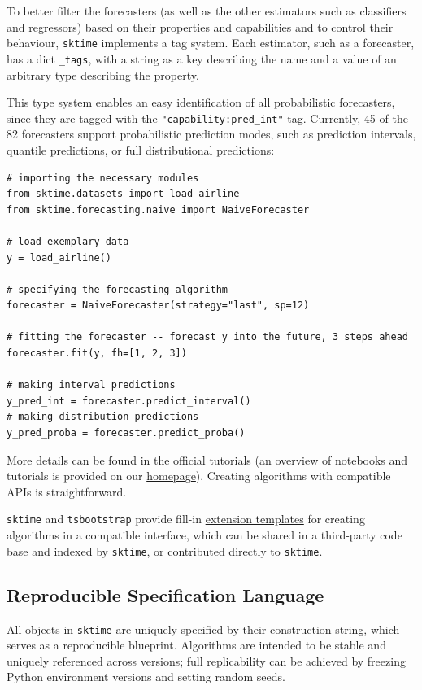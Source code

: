 To better filter the forecasters (as well as the other estimators such as classifiers and regressors) based on their properties and capabilities and to control their behaviour, \texttt{sktime} implements a tag system. Each estimator, such as a forecaster, has a dict \texttt{\_tags}, with a string as a key describing the name and a value of an arbitrary type describing the property.

This type system enables an easy identification of all probabilistic forecasters, since they are tagged with the \texttt{"capability:pred\_int"} tag. Currently, 45 of the 82 forecasters support probabilistic prediction modes, such as prediction intervals, quantile predictions, or full distributional predictions:

\begin{verbatim}
# importing the necessary modules
from sktime.datasets import load_airline
from sktime.forecasting.naive import NaiveForecaster

# load exemplary data
y = load_airline()

# specifying the forecasting algorithm
forecaster = NaiveForecaster(strategy="last", sp=12)

# fitting the forecaster -- forecast y into the future, 3 steps ahead
forecaster.fit(y, fh=[1, 2, 3])

# making interval predictions
y_pred_int = forecaster.predict_interval()
# making distribution predictions
y_pred_proba = forecaster.predict_proba()
\end{verbatim}

More details can be found in the official tutorials (an overview of notebooks and tutorials is provided on our \href{https://www.sktime.net/en/latest/users.html}{homepage}).
Creating algorithms with compatible APIs is straightforward.

\texttt{sktime} and \texttt{tsbootstrap} provide fill-in \href{https://github.com/sktime/sktime/tree/main/extension_templates}{extension templates} for creating algorithms in a compatible interface, which can be shared in a third-party code base and indexed by \texttt{sktime}, or contributed directly to \texttt{sktime}.

\subsection{Reproducible Specification Language}
All objects in \texttt{sktime} are uniquely specified by their construction string, which serves as a reproducible blueprint. Algorithms are intended to be stable and uniquely referenced across versions; full replicability can be achieved by freezing Python environment versions and setting random seeds.

